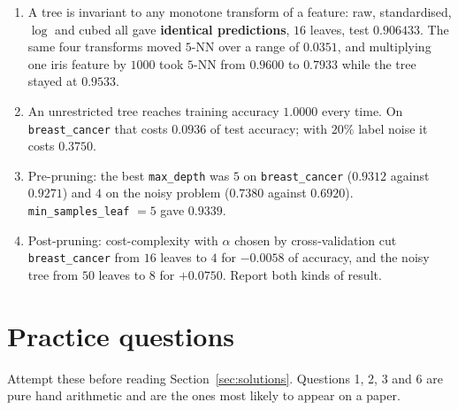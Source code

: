\documentclass[11pt]{article}
\begin{document}
\begin{enumerate}[leftmargin=*]
    \texttt{Outlook}'s $0.156428$, so the identifier still wins. Replicate the
    table to seventy rows and gain ratio recovers the correct five-leaf tree
    while plain gain builds a seventy-leaf one.
  \item A tree is invariant to any monotone transform of a feature: raw,
    standardised, $\log$ and cubed all gave \textbf{identical predictions},
    $16$ leaves, test $0.906433$. The same four transforms moved $5$-NN over a
    range of $0.0351$, and multiplying one iris feature by $1000$ took $5$-NN
    from $0.9600$ to $0.7933$ while the tree stayed at $0.9533$.
  \item An unrestricted tree reaches training accuracy $\mathbf{1.0000}$
    every time. On \texttt{breast\_cancer} that costs $0.0936$ of test
    accuracy; with $20\%$ label noise it costs $0.3750$.
  \item Pre-pruning: the best \texttt{max\_depth} was $5$ on
    \texttt{breast\_cancer} ($0.9312$ against $0.9271$) and $4$ on the noisy
    problem ($0.7380$ against $0.6920$). \texttt{min\_samples\_leaf} $=5$ gave
    $0.9339$.
  \item Post-pruning: cost-complexity with $\alpha$ chosen by cross-validation
    cut \texttt{breast\_cancer} from $16$ leaves to $4$ for $-0.0058$ of
    accuracy, and the noisy tree from $50$ leaves to $8$ for
    $\mathbf{+0.0750}$. Report both kinds of result.
\end{enumerate}

\section{Practice questions}

Attempt these before reading Section~\ref{sec:solutions}. Questions 1, 2, 3
and 6 are pure hand arithmetic and are the ones most likely to appear on a
paper.
\end{document}
